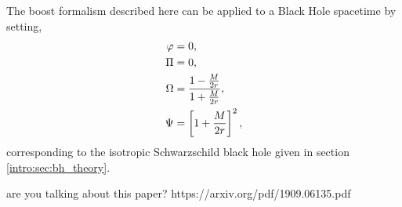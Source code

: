 The boost formalism described here can be applied to a Black Hole spacetime by setting,
\begin{align}
\varphi&=0,\\
\Pi&=0,\\
\Omega &= \frac{1-\frac{M}{2r}}{1+\frac{M}{2r}}, \\
 \Psi &= \left[1+\frac{M}{2r}\right]^2,
 \end{align}
 corresponding to the isotropic Schwarzschild black hole given in section \ref{intro:sec:bh_theory}.

 \color{choral} are you talking about this paper? https://arxiv.org/pdf/1909.06135.pdf \color{black}



